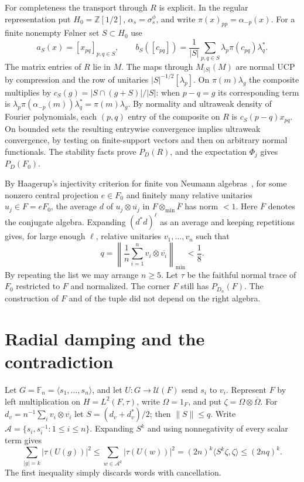 \documentclass[11pt,a4paper]{article}
\newcommand{\minn}{\otimes_{\min}}
\newcommand{\F}{\mathbb F}
\begin{document}
For completeness the transport through \(R\) is explicit. In the regular representation put \(H_0=\mathbb Z[1/2]\), \(\alpha_s=\sigma_s^\phi\), and write \(\pi(x)_{pp}=\alpha_{-p}(x)\). For a finite nonempty F{\o}lner set \(S\subset H_0\) use
\[
 a_S(x)=[x_{pq}]_{p,q\in S},\qquad
 b_S([c_{pq}])=\frac{1}{|S|}\sum_{p,q\in S}\lambda_p\pi(c_{pq})\lambda_q^*.
\]
The matrix entries of \(R\) lie in \(M\). The maps through \(M_{|S|}(M)\) are normal UCP by compression and the row of unitaries \(|S|^{-1/2}[\lambda_p]\). On \(\pi(m)\lambda_g\) the composite multiplies by \(c_S(g)=|S\cap(g+S)|/|S|\): when \(p-q=g\) its corresponding term is \(\lambda_p\pi(\alpha_{-p}(m))\lambda_q^*=\pi(m)\lambda_g\). By normality and ultraweak density of Fourier polynomials, each \((p,q)\) entry of the composite on \(R\) is \(c_S(p-q)x_{pq}\). On bounded sets the resulting entrywise convergence implies ultraweak convergence, by testing on finite-support vectors and then on arbitrary normal functionals. The stability facts prove \(P_D(R)\), and the expectation \(\Phi_j\) gives \(P_D(F_0)\).

By Haagerup's injectivity criterion for finite von Neumann algebras~\cite[Lemma 2.2]{haag85}, for some nonzero central projection \(e\in F_0\) and finitely many relative unitaries \(u_j\in F=eF_0\), the average \(d\) of \(u_j\otimes\overline{u_j}\) in \(F\minn\overline F\) has norm \(<1\). Here \(\overline F\) denotes the conjugate algebra. Expanding \((d^*d)^\ell\) as an average and keeping repetitions gives, for large enough \(\ell\), relative unitaries \(v_1,\ldots,v_n\) such that
\[
 q=\left\|\frac1n\sum_{i=1}^n v_i\otimes\overline{v_i}\right\|_{\min}<\frac18.
\]
By repeating the list we may arrange \(n\ge5\). Let \(\tau\) be the faithful normal trace of \(F_0\) restricted to \(F\) and normalized. The corner \(F\) still has \(P_{D_n}(F)\). The construction of \(F\) and of the tuple did not depend on the right algebra.

\section{Radial damping and the contradiction}
Let \(G=\F_n=\langle s_1,\ldots,s_n\rangle\), and let \(U:G\to\mathcal U(F)\) send \(s_i\) to \(v_i\). Represent \(F\) by left multiplication on \(H=L^2(F,\tau)\), write \(\Omega=1_F\), and put \(\zeta=\Omega\otimes\overline\Omega\). For \(d_v=n^{-1}\sum_i v_i\otimes\overline{v_i}\) let \(S=(d_v+d_v^*)/2\); then \(\|S\|\le q\). Write \(\mathcal A=\{s_i,s_i^{-1}:1\le i\le n\}\). Expanding \(S^k\) and using nonnegativity of every scalar term gives
\begin{equation}\label{eq:moments}
\sum_{|g|=k}|\tau(U(g))|^2
 \le \sum_{w\in\mathcal A^k}|\tau(U(w))|^2
 = (2n)^k\langle S^k\zeta,\zeta\rangle
 \le (2nq)^k .
\end{equation}
The first inequality simply discards words with cancellation.
\end{document}
